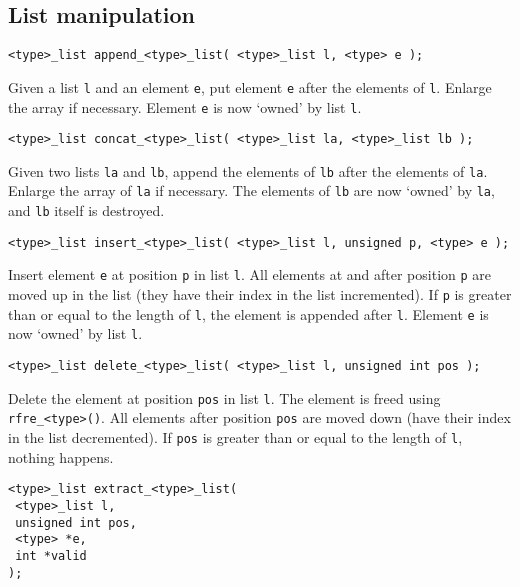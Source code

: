 \subsection{List manipulation}
\begin{verbatim}
<type>_list append_<type>_list( <type>_list l, <type> e );
\end{verbatim}
\begin{desc}
Given a list {\tt l} and an element {\tt e},
put element {\tt e} after the elements of {\tt l}.
Enlarge the array if necessary.
Element {\tt e} is now `owned' by list {\tt l}.
\end{desc}
\begin{verbatim}
<type>_list concat_<type>_list( <type>_list la, <type>_list lb );
\end{verbatim}
\begin{desc}
Given two lists {\tt la} and {\tt lb},
append the elements of {\tt lb} after the elements of {\tt la}.
Enlarge the array of {\tt la} if necessary.
The elements of {\tt lb} are now `owned' by {\tt la},
and {\tt lb} itself is destroyed.
\end{desc}
\begin{verbatim}
<type>_list insert_<type>_list( <type>_list l, unsigned p, <type> e );
\end{verbatim}
\begin{desc}
Insert element {\tt e} at position {\tt p} in list {\tt l}.
All elements at and after position {\tt p} are moved up in the list
(they have their index in the list incremented).
If {\tt p} is greater than or equal to the length of {\tt l},
the element is appended after {\tt l}.
Element {\tt e} is now `owned' by list {\tt l}.
\end{desc}
\begin{verbatim}
<type>_list delete_<type>_list( <type>_list l, unsigned int pos );
\end{verbatim}
\begin{desc}
Delete the element at position {\tt pos} in list {\tt l}.
The element is freed using {\tt rfre\_<type>()}.
All elements after position {\tt pos} are moved down
(have their index in the list decremented).
If {\tt pos} is greater than or equal to the length of {\tt l},
nothing happens.
\end{desc}
\begin{verbatim}
<type>_list extract_<type>_list(
 <type>_list l,
 unsigned int pos,
 <type> *e,
 int *valid
);
\end{verbatim}

